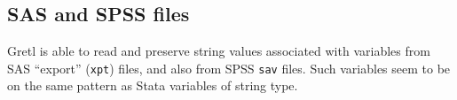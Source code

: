 \subsection{SAS and SPSS files}

Gretl is able to read and preserve string values associated with
variables from SAS ``export'' (\texttt{xpt}) files, and also from SPSS
\texttt{sav} files. Such variables seem to be on the same pattern as
Stata variables of string type.

